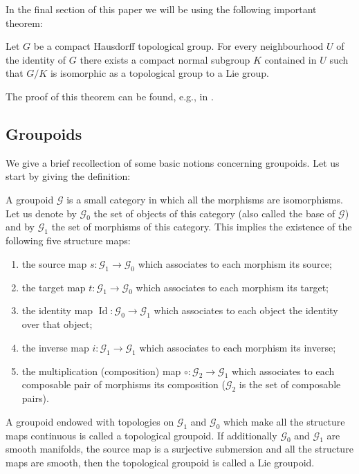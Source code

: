 In the final section of this paper we will be using the following important theorem:
\begin{tw} \label{GY}Let $G$ be a compact Hausdorff topological group. For every neighbourhood $U$ of the identity of $G$ there exists a compact normal subgroup $K$ contained in $U$ such that $G\slash K$ is isomorphic as a topological group to a Lie group.
\end{tw}
The proof of this theorem can be found, e.g., in \cite[Theorem~1.4.14]{TT}.

\subsection{Groupoids}
We give a brief recollection of some basic notions concerning groupoids. Let us start by giving the definition:
\begin{defi} A groupoid $\mathcal{G}$ is a small category in which all the morphisms are isomorphisms. Let us denote by $\mathcal{G}_0$ the set of objects of this category (also called the base of $\mathcal{G}$) and by $\mathcal{G}_1$ the set of morphisms of this category. This implies the existence of the following five structure maps:
\begin{enumerate}\itemsep=0pt
\item[1)] the source map $s\colon \mathcal{G}_1\rightarrow\mathcal{G}_0$ which associates to each morphism its source;
\item[2)] the target map $t\colon \mathcal{G}_1\rightarrow\mathcal{G}_0$ which associates to each morphism its target;
\item[3)] the identity map $\operatorname{Id}\colon \mathcal{G}_0\rightarrow\mathcal{G}_1$ which associates to each object the identity over that object;
\item[4)] the inverse map $i\colon \mathcal{G}_1\rightarrow\mathcal{G}_1$ which associates to each morphism its inverse;
\item[5)] the multiplication (composition) map $\circ\colon \mathcal{G}_2\rightarrow\mathcal{G}_1$ which associates to each composable pair of morphisms its composition ($\mathcal{G}_2$ is the set of composable pairs).
\end{enumerate}
 A groupoid endowed with topologies on $\mathcal{G}_1$ and $\mathcal{G}_0$ which make all the structure maps continuous is called a topological groupoid. If additionally $\mathcal{G}_0$ and $\mathcal{G}_1$ are smooth manifolds, the source map is a surjective submersion and all the structure maps are smooth, then the topological groupoid is called a Lie groupoid.
\end{defi}
